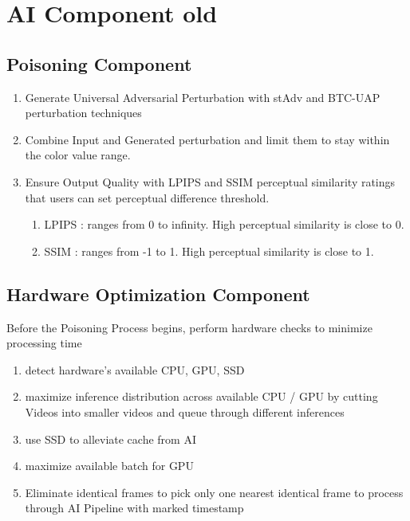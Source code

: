 
\section{AI Component old}
\label{section:ai-component-old}

\subsection{Poisoning Component}
\label{subsection:poisoning-component}
\begin{enumerate}
    \item Generate Universal Adversarial Perturbation with stAdv and BTC-UAP perturbation techniques
    \item Combine Input and Generated perturbation and limit them to stay within the color value range.
    \item Ensure Output Quality with LPIPS and SSIM perceptual similarity ratings that users can set perceptual difference threshold.
    \begin{enumerate}
        \item LPIPS : ranges from 0 to infinity. High perceptual similarity is close to 0.
        \item SSIM : ranges from -1 to 1. High perceptual similarity is close to 1.
    \end{enumerate}
\end{enumerate}

\subsection{Hardware Optimization Component}
\label{subsection:hardware-optimization-component}
Before the Poisoning Process begins, perform hardware checks to minimize processing time
\begin{enumerate}
    \item detect hardware’s available CPU, GPU, SSD
    \item maximize inference distribution across available CPU / GPU by cutting Videos into smaller videos and queue through different inferences
    \item use SSD to alleviate cache from AI
    \item maximize available batch for GPU
    \item Eliminate identical frames to pick only one nearest identical frame to process through AI Pipeline with marked timestamp
\end{enumerate}
